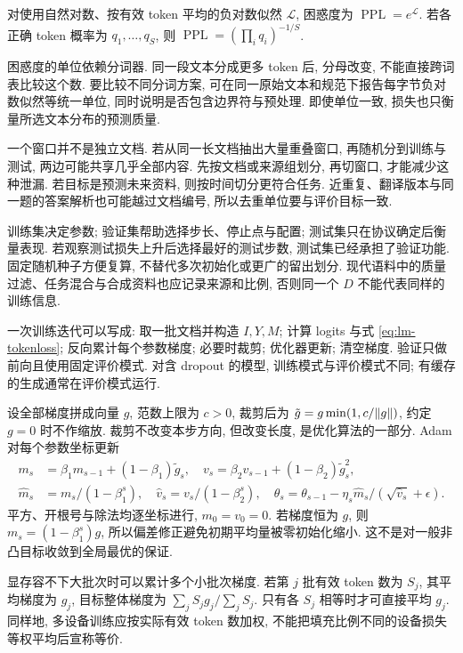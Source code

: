 \begin{definition}
对使用自然对数、按有效 token 平均的负对数似然 $\mathcal L$, 困惑度为 $\operatorname{PPL}=e^{\mathcal L}$. 若各正确 token 概率为 $q_1,\ldots,q_S$, 则 $\operatorname{PPL}=(\prod_iq_i)^{-1/S}$.
\end{definition}
困惑度的单位依赖分词器. 同一段文本分成更多 token 后, 分母改变, 不能直接跨词表比较这个数. 要比较不同分词方案, 可在同一原始文本和规范下报告每字节负对数似然等统一单位, 同时说明是否包含边界符与预处理. 即使单位一致, 损失也只衡量所选文本分布的预测质量.

\label{sec:lm-train}
一个窗口并不是独立文档. 若从同一长文档抽出大量重叠窗口, 再随机分到训练与测试, 两边可能共享几乎全部内容. 先按文档或来源组划分, 再切窗口, 才能减少这种泄漏. 若目标是预测未来资料, 则按时间切分更符合任务. 近重复、翻译版本与同一题的答案解析也可能越过文档编号, 所以去重单位要与评价目标一致.

训练集决定参数; 验证集帮助选择步长、停止点与配置; 测试集只在协议确定后衡量表现. 若观察测试损失上升后选择最好的测试步数, 测试集已经承担了验证功能. 固定随机种子方便复算, 不替代多次初始化或更广的留出划分. 现代语料中的质量过滤、任务混合与合成资料也应记录来源和比例, 否则同一个 $D$ 不能代表同样的训练信息.

一次训练迭代可以写成: 取一批文档并构造 $I,Y,M$; 计算 logits 与式 \eqref{eq:lm-tokenloss}; 反向累计每个参数梯度; 必要时裁剪; 优化器更新; 清空梯度. 验证只做前向且使用固定评价模式. 对含 dropout 的模型, 训练模式与评价模式不同; 有缓存的生成通常在评价模式运行.

设全部梯度拼成向量 $g$, 范数上限为 $c>0$, 裁剪后为 $\tilde g=g\min(1,c/\lVert g\rVert)$, 约定 $g=0$ 时不作缩放. 裁剪不改变本步方向, 但改变长度, 是优化算法的一部分. Adam 对每个参数坐标更新
\begin{align*}
m_s&=\beta_1m_{s-1}+(1-\beta_1)\tilde g_s,\quad
v_s=\beta_2v_{s-1}+(1-\beta_2)\tilde g_s^2,\\
\widehat m_s&=m_s/(1-\beta_1^s),\quad
\widehat v_s=v_s/(1-\beta_2^s),\quad
\theta_s=\theta_{s-1}-\eta_s\widehat m_s/(\sqrt{\widehat v_s}+\epsilon).
\end{align*}
平方、开根号与除法均逐坐标进行, $m_0=v_0=0$. 若梯度恒为 $g$, 则 $m_s=(1-\beta_1^s)g$, 所以偏差修正避免初期平均量被零初始化缩小. 这不是对一般非凸目标收敛到全局最优的保证.

显存容不下大批次时可以累计多个小批次梯度. 若第 $j$ 批有效 token 数为 $S_j$, 其平均梯度为 $g_j$, 目标整体梯度为 $\sum_jS_jg_j/\sum_jS_j$. 只有各 $S_j$ 相等时才可直接平均 $g_j$. 同样地, 多设备训练应按实际有效 token 数加权, 不能把填充比例不同的设备损失等权平均后宣称等价.

